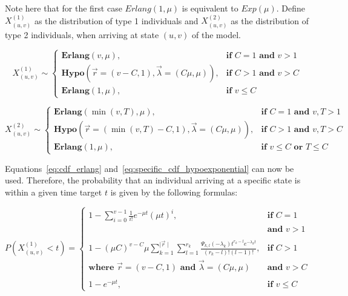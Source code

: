 Note here that for the first case \(Erlang(1, \mu)\) is equivalent to
\(Exp(\mu)\).
Define \(X_{(u,v)}^{(1)}\) as the distribution of type 1 individuals and
\(X_{(u,v)}^{(2)}\) as the distribution of type 2 individuals, when arriving at
state \((u,v)\) of the model.

\small
\begin{equation}
    X_{(u,v)}^{(1)} \sim
    \begin{cases}
        \textbf{Erlang}(v, \mu), & \textbf{if } C = 1 \textbf{ and } v>1 \\
        \textbf{Hypo}\left(\vec{r}=(v - C, 1), \vec{\lambda}=(C \mu, \mu)\right),
            & \textbf{if } C > 1 \textbf{ and } v>C \\
        \textbf{Erlang}(1, \mu), & \textbf{if } v \leq C
    \end{cases}
\end{equation}

\begin{equation}
    X_{(u,v)}^{(2)} \sim
    \begin{cases}
        \textbf{Erlang}(\min(v, T), \mu), & \textbf{if } C = 1
            \textbf{ and } v, T > 1 \\
        \textbf{Hypo}\left(\vec{r}=(\min(v, T) - C, 1), \vec{\lambda}=(C \mu, \mu)\right), &
            \textbf{if } C > 1 \textbf{ and } v, T  > C \\
        \textbf{Erlang}(1, \mu), & \textbf{if } v \leq C \textbf{ or } T \leq C
    \end{cases}
\end{equation}
\normalsize


Equations~\eqref{eq:cdf_erlang} and~\eqref{eq:specific_cdf_hypoexponential} can
now be used.
Therefore, the probability that an individual arriving at a specific state is
within a given time target \(t\) is given by the following formulas:


\footnotesize
\begin{equation}
    P(X_{(u,v)}^{(1)} < t) =
    \begin{cases}
        1 - \sum_{i=0}^{v-1} \frac{1}{i!} e^{-\mu t} (\mu t)^i,
            & \textbf{if } C = 1 \\
        & \textbf{and } v > 1 \\
        & \\
        1 - (\mu C)^{v-C} \mu
            \sum_{k=1}^{\mid \vec{r} \mid} \sum_{l=1}^{r_k}
            \frac{\Psi_{k,l}(-\lambda_k)t^{r_k - l}
            e^{-\lambda_k t}}{(r_k - l)! (l - 1)!},
            & \textbf{if } C > 1 \\
        \textbf{where } \vec{r}=(v - C, 1) \textbf{ and }
            \vec{\lambda}=(C \mu, \mu) & \textbf{and } v > C \\
        & \\
        1 - e^{-\mu t},  & \textbf{if } v \leq C
    \end{cases}
\end{equation}

